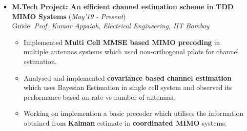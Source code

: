 \documentclass[10pt]{article}
\begin{document}

\vspace*{115pt}


\colorbox{bl}{}%
\vspace{-0.08cm}
\begin{itemize}[leftmargin=0.4cm]
\item \textbf{M.Tech Project: An efficient channel estimation scheme in TDD MIMO Systems}
\hfill{(\textit{May'19 - Present})} \\
Guide: \textit{Prof. Kumar Appaiah, Electrical Engineering, IIT Bombay}\\
\vspace{-0.6cm}
\begin{itemize}
\item Implemented \textbf{Multi Cell MMSE based MIMO precoding} in multiple antennas systems which used non-orthogonal pilots for channel estimation.\vspace{-0.1cm}
\item Analysed and implemented \textbf{covariance based channel estimation} which uses Bayesian Estimation in single cell system and observed its performance based on rate vs number of antennas. 
\vspace{-0.1cm}
\end{itemize}
\vspace{-0.2cm}

\begin{itemize}
\item  Working on implemention a basic precoder which utilises the information obtained from \textbf{Kalman} estimate in \textbf{coordinated MIMO} systems.\vspace{-0.1cm}
\end{itemize}


\end{itemize}
\end{document}
